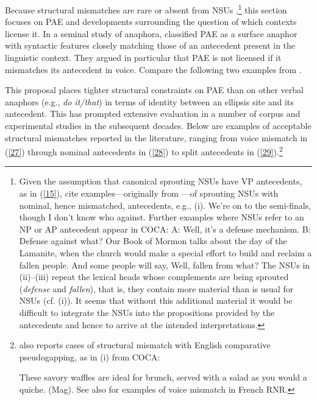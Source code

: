 {Because structural mismatches are rare or absent from NSUs \citep[see][]{Merchant2005a, Merchant2013},\footnote{Given the assumption that canonical sprouting NSUs have VP antecedents, as in (\ref{15}), \citet[95]{Ginzburg2018} cite examples---originally from \citet[13]{Beecher2008}---of sprouting NSUs with nominal, hence mismatched, antecedents, e.g., (i).
	\ea We're on to the semi-finals, though I don't know who against.\z
%
	Further examples where NSUs refer to an NP or AP antecedent appear in COCA:
%
	\ea  A: Well, it's a defense mechanism. B: Defense against what?\z
	\ea Our Book of Mormon talks about the day of the Lamanite, when the church would make a special effort to build and reclaim a fallen people. And some people will say, Well, fallen from what? \z
%
	The NSUs in (ii)--(iii) repeat the lexical heads whose complements are being sprouted (\textit{defense} and \textit{fallen}), that is, they contain more material than is usual for NSUs (cf. (i)). It seems that without this additional material it would be difficult to integrate the NSUs into the propositions provided by the antecedents and hence to arrive at the intended interpretations.} this section focuses on PAE and developments surrounding the question of which contexts license it. In a seminal study of anaphora, \citet{Hankamer1976} classified PAE as a surface anaphor with syntactic features closely matching those of an antecedent present in the linguistic context. They argued in particular that PAE is not licensed if it mismatches its antecedent in voice. Compare the following two examples from \citet[327]{Hankamer1976}.

\eal
{}
\zl
This proposal places tighter structural constraints on PAE than on other verbal anaphors (e.g., \textit{do it/that}) in terms of identity between an ellipsis site and its antecedent. This has prompted extensive evaluation in a number of corpus and experimental studies in the subsequent decades. Below are examples of acceptable structural mismatches reported in the literature, ranging from voice mismatch in (\ref{27}) through nominal antecedents in (\ref{28}) to split antecedents in (\ref{29}).\footnote{\citet[87]{Miller2014} also reports cases of structural mismatch with English comparative pseudogapping, as in (i) from COCA:

\ea These savory waffles are ideal for brunch, served with a salad as you would a quiche. (Mag).\z
%
See also \citet{Abeille2016} for examples of voice mismatch in French RNR. 
}

}
